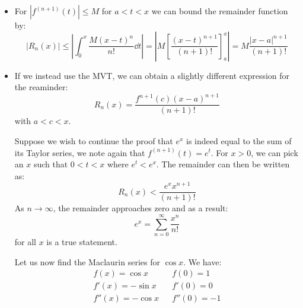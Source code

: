 \begin{itemize}
\begin{theorem}
\begin{proof}
            \begin{equation}
                f(x) = f(a)+(x-a)f'(a)+\frac{(x-a)^2}{2!}f''(a)+\cdots + \frac{(x-a)^n}{n!}f^{(n)}(a) + R_n(x)
            \end{equation}
            where from our previous work, we have
            \begin{equation}
                R_n(x) = \int_a^x \frac{(x-t)^n}{n!}f^{n+1}(t) \dd{t}
            \end{equation}
        \end{proof}
    \end{theorem}
    \item For $|f^{(n+1)}(t)| \le M$ for $a<t < x$ we can bound the remainder function by:
    \begin{equation}
        |R_n(x)| \le \left|\int_0^x \frac{M(x-t)^n}{n!}\dd{t}\right| = \left|M\left[\frac{(x-t)^{n+1}}{(n+1)!}\right]^x_a\right| = M\frac{|x-a|^{n+1}}{(n+1)!}
    \end{equation}
    \item If we instead use the MVT, we can obtain a slightly different expression for the reaminder:
    \begin{equation}
        R_n(x) = \frac{f^{n+1}(c)(x-a)^{n+1}}{(n+1)!}
    \end{equation}
    with $a<c<x$.
    \begin{example}
        Suppose we wish to continue the proof that $e^x$ is indeed equal to the sum of its Taylor series, we note again that $f^{(n+1)}(t)=e^t$. For $x>0$, we can pick an $x$ such that $0<t<x$ where $e^t<e^x$. The remainder can then be written as:
        \begin{equation}
            R_n(x) < \frac{e^xx^{n+1}}{(n+1)!}
        \end{equation}
        As $n\to\infty$, the remainder approaches zero and as a result:
        \begin{equation}
            e^x = \sum_{n=0}^\infty \frac{x^n}{n!}
        \end{equation}
        for all $x$ is a true statement.
    \end{example}
    \begin{example}
        Let us now find the Maclaurin series for $\cos x$. We have:
        \begin{align}
            f(x)=\cos x && f(0)=1 \\ 
            f'(x)=-\sin x && f'(0)=0 \\ 
            f''(x) = -\cos x && f''(0)=-1 \\ 

\end{align}
\end{example}
\end{itemize}
